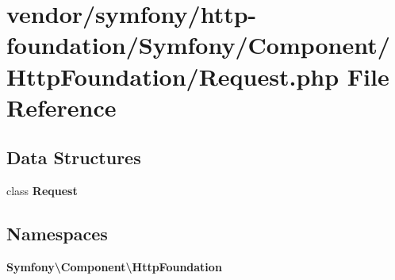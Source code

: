 \section{vendor/symfony/http-\/foundation/\+Symfony/\+Component/\+Http\+Foundation/\+Request.php File Reference}
\label{vendor_2symfony_2http-foundation_2_symfony_2_component_2_http_foundation_2_request_8php}
\subsection*{Data Structures}
\begin{DoxyCompactItemize}
\item 
class {\bf Request}
\end{DoxyCompactItemize}
\subsection*{Namespaces}
\begin{DoxyCompactItemize}
\item 
 {\bf Symfony\textbackslash{}\+Component\textbackslash{}\+Http\+Foundation}
\end{DoxyCompactItemize}
